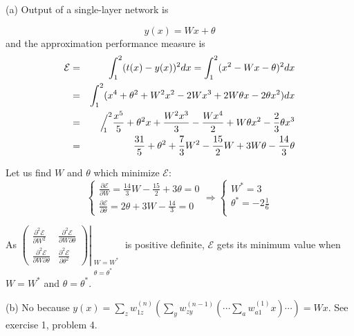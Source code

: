 \begin{enumerate}
  \begin{solution}

    (a) Output of a single-layer network is

    \begin{equation*}
      y(x)=Wx+\theta
    \end{equation*}
    and the approximation performance measure is
    \begin{eqnarray*}
      \mathcal{E}&=&\int_1^2(t(x)-y(x))^2 dx = \int_1^2
      (x^2-Wx-\theta)^2dx\\
      &=&\int_1^2 (x^4+\theta^2 +W^2x^2-2Wx^3+2W\theta x-2\theta x^2)dx\\
      &=&\Big/^2_{\mspace{-11.0mu} 1} \frac{x^5}{5}
      +\theta^2x+\frac{W^2x^3}{3}-\frac{Wx^4}{2}+W\theta x^2-\frac{2}{3}\theta x^3\\
      &=&\frac{31}{5}+\theta^2 +\frac{7}{3}W^2-\frac{15}{2}W+3W\theta-\frac{14}{3}\theta
    \end{eqnarray*}

    Let us find $W$ and $\theta$ which minimize $\mathcal{E}$:
    \begin{equation*}
      \left\{\begin{array}{l}
          \frac{\partial\mathcal{E}}{\partial
            W}=\frac{14}{3}W-\frac{15}{2}+3\theta = 0\\
          \frac{\partial\mathcal{E}}{\partial
            \theta}=2\theta+3W -\frac{14}{3} = 0
        \end{array}\right.
      \Rightarrow
      \left\{\begin{array}{l}
          W^*=3\\
          \theta^*=-2\frac{1}{6}\\
        \end{array}\right.
    \end{equation*}

    As $\left.\begin{pmatrix} \frac{\partial^2\mathcal{E}}{\partial W^2} &
        \frac{\partial^2\mathcal{E}}{\partial W \partial\theta}\\
        \frac{\partial^2\mathcal{E}}{\partial W \partial\theta} &
        \frac{\partial^2\mathcal{E}}{\partial\theta^2}
      \end{pmatrix}\right|_{\begin{array}{l}\scriptstyle  W=W^*\\\theta=\theta^*\end{array}}$
    is positive definite, $\mathcal{E}$ gets its minimum value when
    $W=W^*$ and $\theta=\theta^*$.

    \vspace{0.5cm}
    (b) No because $y(x)=\sum_z w_{1z}^{(n)}\left(\sum_y
      w_{zy}^{(n-1)}\left(\dotsm \sum_a w_{a1}^{(1)}x\right)\dotsm\right) = Wx$. See
    exercise 1, problem 4.

  \end{solution}
  


\end{enumerate}

